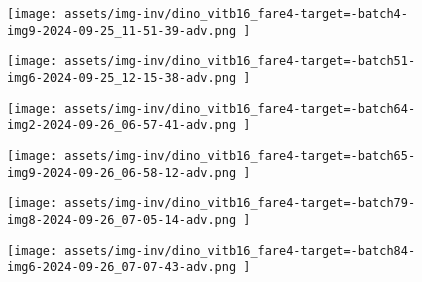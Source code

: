 \begin{figure*}[t]
    \vspace{1mm}
    \begin{minipage}[t]{.025\textwidth}
         \vspace{9mm}
    \end{minipage}%
    \begin{minipage}[t]{.98\textwidth}
        \vspace{0pt}
            \begin{subfigure}[t]{0.16\textwidth}
                    \texttt{[image:  assets/img-inv/dino\_vitb16\_fare4-target=-batch4-img9-2024-09-25\_11-51-39-adv.png ]}
            \end{subfigure}%
                \hspace{0.5mm}%
            \begin{subfigure}[t]{0.16\textwidth}
                    \texttt{[image:  assets/img-inv/dino\_vitb16\_fare4-target=-batch51-img6-2024-09-25\_12-15-38-adv.png ]}
            \end{subfigure}%
                \hspace{0.5mm}%
            \begin{subfigure}[t]{0.16\textwidth}
                    \texttt{[image:  assets/img-inv/dino\_vitb16\_fare4-target=-batch64-img2-2024-09-26\_06-57-41-adv.png ]}
            \end{subfigure}%
                \hspace{0.5mm}%
            \begin{subfigure}[t]{0.16\textwidth}
                    \texttt{[image:  assets/img-inv/dino\_vitb16\_fare4-target=-batch65-img9-2024-09-26\_06-58-12-adv.png ]}
            \end{subfigure}%
                \hspace{0.5mm}%
            \begin{subfigure}[t]{0.16\textwidth}
                    \texttt{[image:  assets/img-inv/dino\_vitb16\_fare4-target=-batch79-img8-2024-09-26\_07-05-14-adv.png ]}
            \end{subfigure}%
                \hspace{0.5mm}%
            \begin{subfigure}[t]{0.16\textwidth}
                    \texttt{[image:  assets/img-inv/dino\_vitb16\_fare4-target=-batch84-img6-2024-09-26\_07-07-43-adv.png ]}
            \end{subfigure}%
    \end{minipage}


\end{figure*}
